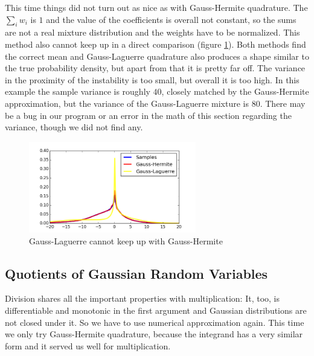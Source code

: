 \documentclass[11pt,a4paper]{book}
\begin{document}
This time things did not turn out as nice as with Gauss-Hermite quadrature. The
$\sum_{i} w_{i}$ is $1$ and the value of the coefficients is overall not
constant, so the sums are not a real mixture distribution and the weights have
to be normalized. This method also cannot keep up in a direct comparison (figure
\ref{fig:hermite-laguerre}). Both methods find the correct mean and
Gauss-Laguerre quadrature also produces a shape similar to the true probability
density, but apart from that it is pretty far off. The variance in the proximity
of the instability is too small, but overall it is too high. In this example the
sample variance is roughly $40$, closely matched by the Gauss-Hermite
approximation, but the variance of the Gauss-Laguerre mixture is $80$. There may
be a bug in our program or an error in the math of this section regarding the
variance, though we did not find any.
\begin{figure}[h]
  \centering
  \includegraphics[width=0.65\textwidth]{thesis/theory/hermite-laguerre}
  \caption{Gauss-Laguerre cannot keep up with Gauss-Hermite}
  \label{fig:hermite-laguerre}
\end{figure}

\subsection{Quotients of Gaussian Random Variables}

Division shares all the important properties with multiplication: It, too, is
differentiable and monotonic in the first argument and Gaussian distributions
are not closed under it. So we have to use numerical approximation again. This
time we only try Gauss-Hermite quadrature, because the integrand has a very
similar form and it served us well for multiplication.
\end{document}
